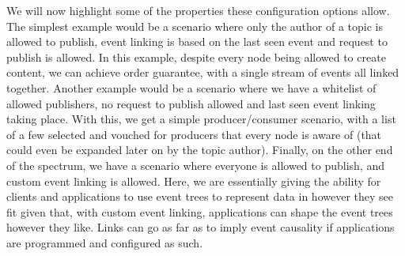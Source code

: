 We will now highlight some of the properties these configuration options allow.
The simplest example would be a scenario where only the author of a topic is
allowed to publish, event linking is based on the last seen event and request
to publish is allowed. In this example, despite every node being allowed to
create content, we can achieve order guarantee, with a single stream of events
all linked together. Another example would be a scenario where we have a
whitelist of allowed publishers, no request to publish allowed and last seen
event linking taking place. With this, we get a simple producer/consumer
scenario, with a list of a few selected and vouched for producers that every
node is aware of (that could even be expanded later on by the topic author).
Finally, on the other end of the spectrum, we have a scenario where everyone is
allowed to publish, and custom event linking is allowed. Here, we are
essentially giving the ability for clients and applications to use event trees
to represent data in however they see fit given that, with custom event
linking, applications can shape the event trees however they like. Links can go
as far as to imply event causality if applications are programmed and
configured as such.
